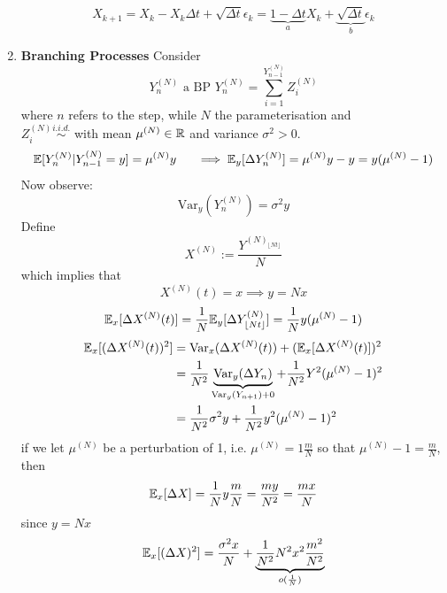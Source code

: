\documentclass{article}
\begin{document}
\begin{enumerate}
\begin{equation*}
		X_{k+1} = X_k -X_k \Delta t + \sqrt{\Delta t}\epsilon_k=\underbrace{1-\Delta t}_{a}X_k + \underbrace{\sqrt{\Delta t}}_{b}\epsilon_k
	\end{equation*}
	\item \textbf{Branching Processes}
	Consider 
	\begin{equation*}
		Y^{(N)}_n \text{ a BP   } Y^{(N)}_n = \sum_{i=1}^{Y^{(N)}_{n-1}} Z_i^{(N)}
	\end{equation*}
	where $n$ refers to the step, while $N$ the parameterisation and \\
	$Z_i^{(N)} \stackrel{i.i.d.}{\sim}$  
	with mean $\mu^{(N)} \in \mathbb{R}$ and variance $\sigma^2 > 0$. 
	\begin{equation*}
		\mathbb{E}[Y_n^{(N)}|Y_{n-1}^{(N)}=y] = \mu^{(N)}y  \hspace{0.5 cm}\implies \mathbb{E}_y[\Delta Y_n^{(N)}]= \mu^{(N)} y -y =y(\mu^{(N)}-1)
	\end{equation*}
	Now observe:
	\begin{equation*}
		\text{Var}_y(Y_n^{(N)})=\sigma^2 y
	\end{equation*}
	Define
	\begin{equation*}
		X^{(N)}:= \frac{Y^{(N)_{\lfloor Nt \rfloor}}}{N}    
	\end{equation*}
	which implies that 
	\begin{equation*}
		X^{(N)}(t) = x \implies y = N x
	\end{equation*}
	\begin{equation*}
		\mathbb{E}_x[\Delta X^{(N)}(t)]=\frac{1}{N}\mathbb{E}_y[\Delta Y^{(N)}_{\lfloor Nt \rfloor}]=\frac{1}{N}y(\mu^{(N)}-1)
	\end{equation*}
	\begin{align*}
		\mathbb{E}_x [(\Delta X^{(N)}(t))^2] &= \text{Var}_x (\Delta X^{(N)}(t)) + (\mathbb{E}_x[\Delta X^{(N)}(t)])^2 \\
		& = \frac{1}{N^2} \underbrace{\text{Var}_y (\Delta Y_n )}_{\text{Var}_y (Y_{n+1} )+0 } + \frac{1}{N^2} Y^2(\mu^{(N)}-1)^2 \\
		&= \frac{1}{N^2}\sigma^2 y + \frac{1}{N^2}y^2(\mu^{(N)}-1)^2 
	\end{align*}
	if we let $\mu^{(N)}$ be a perturbation of 1, i.e. $\mu^{(N)}= 1 \frac{m}{N}$ so that $\mu^{(N)}- 1=  \frac{m}{N}$, then
	\begin{equation*}
		\mathbb{E}_x [\Delta X] = \frac{1}{N} y \frac{m}{N} = \frac{my}{N^2} = \frac{mx}{N}
	\end{equation*}
	since $y = Nx$
	\begin{equation*}
		\mE_x[(\Delta X)^2] = \frac{\sigma^2 x }{N} + \underbrace{\frac{1}{N^2} N^2 x^2 \frac{m^2}{N^2}}_{o(\frac{1}{N})}

\end{equation*}
\end{enumerate}
\end{document}
